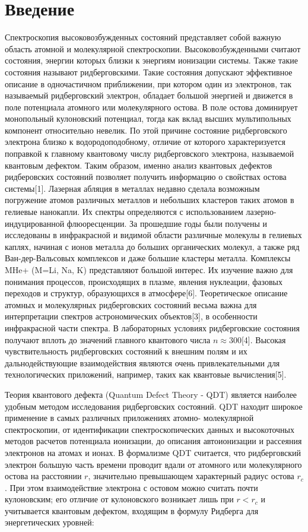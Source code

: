 \documentclass[]{interact}
\theoremstyle{plain}%
\theoremstyle{definition}
\theoremstyle{remark}
\begin{document}
\section{Введение}
Спектроскопия высоковозбужденных состояний представляет собой важную область атомной и молекулярной спектроскопии. Высоковозбужденными считают состояния, энергии которых близки к энергиям ионизации системы.
Также такие состояния называют ридберговскими. Такие состояния допускают эффективное описание в одночастичном приближении, при котором один из электронов, так называемый ридберговский электрон, обладает большой энергией и движется в поле потенциала атомного или молекулярного остова. В поле остова доминирует монопольный кулоновский потенциал, тогда как вклад высших мультипольных компонент относительно невелик. По этой причине состояние ридберговского электрона близко к водородоподобному, отличие от которого характеризуется поправкой к главному квантовому числу ридберговского электрона, называемой квантовым дефектом. Таким образом, именно анализ квантовых дефектов ридберовских состояний позволяет получить информацию о свойствах остова системы[1].
Лазерная абляция в металлах недавно сделала возможным погружение атомов различных металлов и небольших кластеров таких атомов в гелиевые нанокапли. Их спектры определяются с использованием лазерно-индуцированной флюоресценции.
За прошедшие годы были получены и исследованы в инфракрасной и видимой области различные молекулы в гелиевых каплях, начиная с ионов металла до больших органических молекул, а также ряд Ван-дер-Вальсовых комплексов и даже большие кластеры металла. Комплексы MHe+ (M=Li, Na, K) представляют большой интерес. Их изучение важно для понимания процессов, происходящих в плазме, явления нуклеации, фазовых переходов и структур, образующихся в атмосфере[6].
Теоретическое описание атомных и молекулярных ридберговских состояний весьма важна для интерпретации спектров астрономических объектов[3], в особенности инфракрасной части спектра. В лабораторных условиях ридберговские состояния получают вплоть до значений главного квантового числа $n\approx300$[4]. Высокая чувствительность ридберговских состояний к внешним полям и их дальнодействующие взаимодействия являются очень привлекательными для технологических приложений, например, таких как квантовые вычисления[5].

Теория квантового дефекта (Quantum Defect Theory - QDT) является наиболее удобным методом исследования ридберговских состояний. QDT находит широкое применение в самых различных приложениях атомно- молекулярной спектроскопии, от идентификации спектроскопических данных и высокоточных методов расчетов потенциала ионизации, до описания автоионизации и рассеяния электронов на атомах и ионах. В формализме QDT считается, что ридберговский электрон большую часть времени проводит вдали от атомного или молекулярного остова на расстоянии $r$, значительно превышающем характерный радиус остова $r_c$. При этом взаимодействие электрона с остовом можно считать почти кулоновским; его отличие от кулоновского возникает лишь при $r<r_c$ и учитывается квантовым дефектом, входящим в формулу Ридберга для энергетических уровней:
\end{document}
